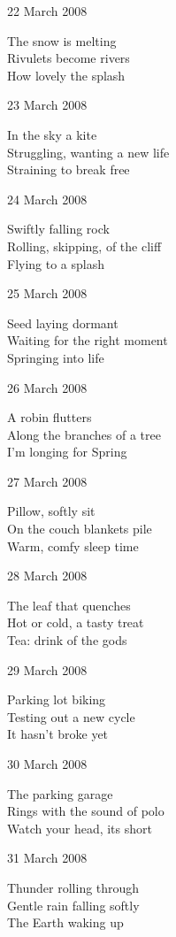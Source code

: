 \documentclass[12pt]{article}
\begin{document}
22 March 2008 

The snow is melting \\
Rivulets become rivers \\
How lovely the splash

23 March 2008

In the sky a kite \\
Struggling, wanting a new life \\
Straining to break free

24 March 2008

Swiftly falling rock \\
Rolling, skipping, of the cliff \\
Flying to a splash

\newpage

25 March 2008

Seed laying dormant \\
Waiting for the right moment \\
Springing into life

26 March 2008

A robin flutters \\
Along the branches of a tree \\
I'm longing for Spring

27 March 2008

Pillow, softly sit \\
On the couch blankets pile \\
Warm, comfy sleep time

28 March 2008

The leaf that quenches \\
Hot or cold, a tasty treat \\
Tea: drink of the gods

29 March 2008

Parking lot biking \\
Testing out a new cycle \\
It hasn't broke yet

30 March 2008

The parking garage \\
Rings with the sound of polo \\
Watch your head, its short

31 March 2008

Thunder rolling through \\
Gentle rain falling softly \\
The Earth waking up


\newpage
\end{document}
